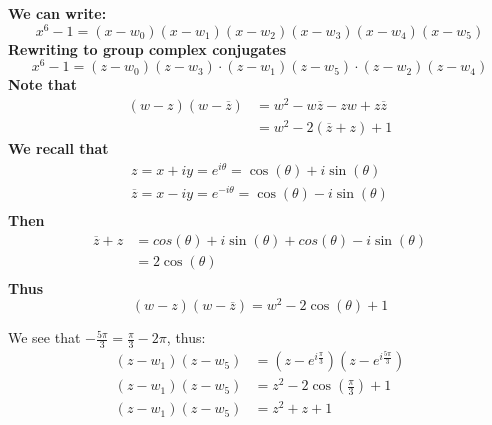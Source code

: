 \documentclass[a4paper, 8pt]{extarticle}
\begin{document}
\begin{examplebox}[Determine all solutions to $z^6 -1 = 0$ and factor $x^6-1$ as a product of linear and quadratic factors]
\begin{minipage}{0.5\textwidth}
\begin{center}
        \end{center}
    \end{minipage}

    \textbf{We can write:}
    $$x^6 -1 = (x - w_0)(x - w_1)(x - w_2)(x - w_3)(x - w_4)(x - w_5)$$
    \textbf{Rewriting to group complex conjugates}
    $$x^6 -1 = (z-w_0)(z-w_3) \cdot (z-w_1)(z-w_5) \cdot (z-w_2)(z-w_4)$$
    \textbf{Note that}
    \begin{align*}
        (w-z)(w-\overline{z}) & = w^2 - w\overline{z} - zw + z\overline{z} \\
                              & = w^2 - 2(\overline{z} + z) + 1
    \end{align*}
    \textbf{We recall that}
    \begin{align*}
        z = x + iy = e^{i\theta} = \cos(\theta) + i\sin(\theta)             \\
        \overline{z} = x - iy = e^{-i\theta} = \cos(\theta) - i\sin(\theta) \\
    \end{align*}
    \textbf{Then}
    \begin{align*}
        \overline{z} + z & = cos(\theta) + i\sin(\theta) + cos(\theta) - i\sin(\theta) \\
                         & = 2\cos(\theta)                                             \\
    \end{align*}
    \textbf{Thus}
    $$(w-z)(w-\overline{z})  = w^2 - 2\cos(\theta) + 1$$
    \begin{minipage}{0.49\textwidth}
        We see that $-\frac{5\pi}{3} = \frac{\pi}{3} - 2\pi$, thus:
        \begin{align*}
            (z-w_1)(z-w_5) & = (z - e^{i\frac{\pi}{3}})(z - e^{i\frac{5\pi}{3}}) \\
            (z-w_1)(z-w_5) & = z^2 - 2\cos\left(\frac{\pi}{3}\right) + 1         \\
            (z-w_1)(z-w_5) & = z^2 + z + 1

\end{align*}
\end{minipage}
\end{examplebox}
\end{document}
